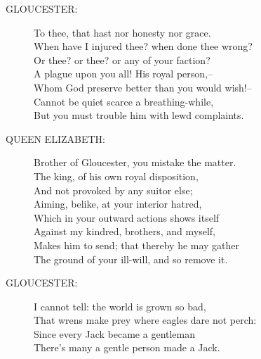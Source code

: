\documentclass{article}
\begin{document}
\begin{description}
\item[GLOUCESTER:] 
\hspace{1pt}To thee, that hast nor honesty nor grace.\\
\hspace{1pt}When have I injured thee? when done thee wrong?\\
\hspace{1pt}Or thee? or thee? or any of your faction?\\
\hspace{1pt}A plague upon you all! His royal person,--\\
\hspace{1pt}Whom God preserve better than you would wish!--\\
\hspace{1pt}Cannot be quiet scarce a breathing-while,\\
\hspace{1pt}But you must trouble him with lewd complaints.\\
\end{description}
\begin{description}
\item[QUEEN ELIZABETH:] 
\hspace{1pt}Brother of Gloucester, you mistake the matter.\\
\hspace{1pt}The king, of his own royal disposition,\\
\hspace{1pt}And not provoked by any suitor else;\\
\hspace{1pt}Aiming, belike, at your interior hatred,\\
\hspace{1pt}Which in your outward actions shows itself\\
\hspace{1pt}Against my kindred, brothers, and myself,\\
\hspace{1pt}Makes him to send; that thereby he may gather\\
\hspace{1pt}The ground of your ill-will, and so remove it.\\
\end{description}
\begin{description}
\item[GLOUCESTER:] 
\hspace{1pt}I cannot tell: the world is grown so bad,\\
\hspace{1pt}That wrens make prey where eagles dare not perch:\\
\hspace{1pt}Since every Jack became a gentleman\\
\hspace{1pt}There's many a gentle person made a Jack.\\
\end{description}
\end{document}
